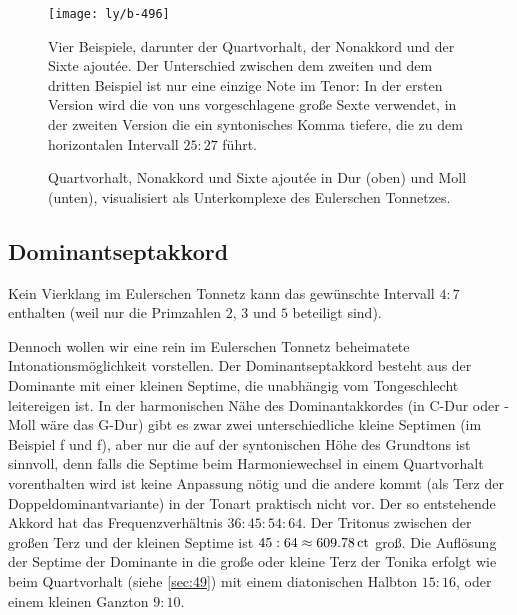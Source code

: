\begin{figure}
  \centering
  \texttt{[image: ly/b-496]}
  \caption{Vier Beispiele, darunter der Quartvorhalt, der Nonakkord und der
  	Sixte ajoutée. Der Unterschied zwischen dem zweiten und dem dritten Beispiel
  	ist nur eine einzige Note im Tenor: In der ersten Version wird die von uns
  	vorgeschlagene große Sexte verwendet, in der zweiten Version die ein
  	syntonisches Komma tiefere, die zu dem horizontalen Intervall $25:27$
  	führt.}\label{fig:496}
\end{figure}

\begin{figure}
  \centering
  
  \caption{Quartvorhalt, Nonakkord und Sixte ajoutée in Dur
    (oben) und Moll (unten), visualisiert als Unterkomplexe des Eulerschen
    Tonnetzes.}\label{fig:chordLines}
\end{figure}

\subsection{Dominantseptakkord}

Kein Vierklang im Eulerschen Tonnetz kann das gewünschte Intervall $4:7$
enthalten (weil nur die Primzahlen $2$, $3$ und $5$ beteiligt
sind).

Dennoch wollen wir eine rein im Eulerschen Tonnetz beheimatete
Intonationsmöglichkeit vorstellen. Der Dominantseptakkord besteht aus der
Dominante mit einer kleinen Septime, die unabhängig vom Tongeschlecht
leitereigen ist. In der harmonischen Nähe des Dominantakkordes (in C-Dur oder
-Moll wäre das G-Dur) gibt es zwar zwei unterschiedliche kleine Septimen (im
Beispiel \natural f und \naturalp f), aber nur die auf der syntonischen Höhe
des Grundtons ist sinnvoll, denn falls die Septime beim Harmoniewechsel in
einem Quartvorhalt vorenthalten wird ist keine Anpassung nötig und die andere
kommt (als Terz der Doppeldominantvariante) in der Tonart praktisch nicht vor.
Der so entstehende Akkord hat das Frequenzverhältnis $36:45:54:64$. Der Tritonus
zwischen der großen Terz und der kleinen Septime ist
$45:64\approx 609.78\,\mathrm{ct}$ groß. Die Auflösung der Septime der Dominante in
die große oder kleine Terz der Tonika erfolgt wie beim Quartvorhalt (siehe
\cref{sec:49}) mit einem diatonischen Halbton $15:16$, oder einem kleinen
Ganzton $9:10$.

